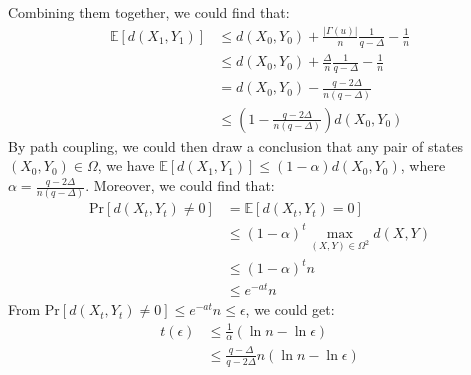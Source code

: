 \documentclass{article}
\begin{document}
Combining them together, we could find that:
\begin{align*}
  \mathbb{E}[d(X_1, Y_1)] &\leq d(X_0, Y_0) + \frac{|\Gamma(u)|}{n}\frac{1}{q-\Delta} - \frac{1}{n} \\
   &\leq d(X_0, Y_0) + \frac{\Delta}{n}\frac{1}{q-\Delta} - \frac{1}{n} \\
   &= d(X_0, Y_0) - \frac{q-2\Delta}{n(q-\Delta)} \\
   &\leq (1-\frac{q-2\Delta}{n(q-\Delta)}) d(X_0, Y_0)
\end{align*}
By path coupling, we could then draw a conclusion that any pair of states $(X_0, Y_0) \in \Omega$, we have $\mathbb{E}[d(X_1, Y_1)] \leq (1 - \alpha)d(X_0, Y_0)$, where $\alpha = \frac{q-2\Delta}{n(q-\Delta)}$. Moreover, we could find that:
\begin{align*}
  \mbox{Pr}[d(X_t, Y_t)\not=0] &= \mathbb{E}[d(X_t, Y_t) = 0] \\
  &\leq (1-\alpha)^t\max_{(X, Y)\in \Omega^2}d(X, Y)\\
                               &\leq (1-\alpha)^tn \\
  &\leq e^{-at}n
\end{align*}
From $\mbox{Pr}[d(X_t, Y_t)\not=0]\leq e^{-at}n\leq \epsilon$, we could get:
\begin{align*}
  t(\epsilon) &\leq \frac{1}{\alpha} (\ln n - \ln \epsilon) \\
  &\leq \frac{q-\Delta}{q-2\Delta}n(\ln n - \ln \epsilon) \\
\end{align*}
\end{document}
